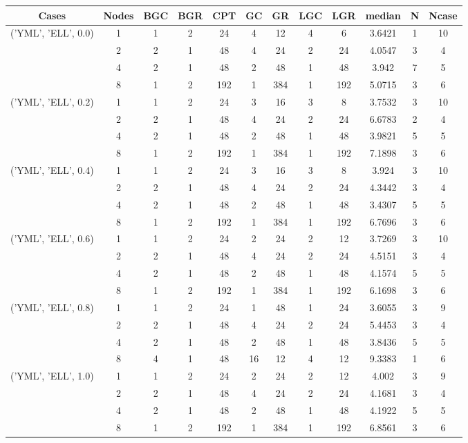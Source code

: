 \begin{tabular}{cccccccccccc}
\hline
Cases & Nodes& BGC& BGR& CPT& GC& GR& LGC& LGR& median & N & Ncase \\
\hline
\multirow{4}{*}{('YML', 'ELL', 0.0)}& 1& 1& 2& 24& 4& 12& 4& 6& 3.6421& 1& 10\\
& 2& 2& 1& 48& 4& 24& 2& 24& 4.0547& 3& 4\\
& 4& 2& 1& 48& 2& 48& 1& 48& 3.942& 7& 5\\
& 8& 1& 2& 192& 1& 384& 1& 192& 5.0715& 3& 6\\
\hline
\multirow{4}{*}{('YML', 'ELL', 0.2)}& 1& 1& 2& 24& 3& 16& 3& 8& 3.7532& 3& 10\\
& 2& 2& 1& 48& 4& 24& 2& 24& 6.6783& 2& 4\\
& 4& 2& 1& 48& 2& 48& 1& 48& 3.9821& 5& 5\\
& 8& 1& 2& 192& 1& 384& 1& 192& 7.1898& 3& 6\\
\hline
\multirow{4}{*}{('YML', 'ELL', 0.4)}& 1& 1& 2& 24& 3& 16& 3& 8& 3.924& 3& 10\\
& 2& 2& 1& 48& 4& 24& 2& 24& 4.3442& 3& 4\\
& 4& 2& 1& 48& 2& 48& 1& 48& 3.4307& 5& 5\\
& 8& 1& 2& 192& 1& 384& 1& 192& 6.7696& 3& 6\\
\hline
\multirow{4}{*}{('YML', 'ELL', 0.6)}& 1& 1& 2& 24& 2& 24& 2& 12& 3.7269& 3& 10\\
& 2& 2& 1& 48& 4& 24& 2& 24& 4.5151& 3& 4\\
& 4& 2& 1& 48& 2& 48& 1& 48& 4.1574& 5& 5\\
& 8& 1& 2& 192& 1& 384& 1& 192& 6.1698& 3& 6\\
\hline
\multirow{4}{*}{('YML', 'ELL', 0.8)}& 1& 1& 2& 24& 1& 48& 1& 24& 3.6055& 3& 9\\
& 2& 2& 1& 48& 4& 24& 2& 24& 5.4453& 3& 4\\
& 4& 2& 1& 48& 2& 48& 1& 48& 3.8436& 5& 5\\
& 8& 4& 1& 48& 16& 12& 4& 12& 9.3383& 1& 6\\
\hline
\multirow{4}{*}{('YML', 'ELL', 1.0)}& 1& 1& 2& 24& 2& 24& 2& 12& 4.002& 3& 9\\
& 2& 2& 1& 48& 4& 24& 2& 24& 4.1681& 3& 4\\
& 4& 2& 1& 48& 2& 48& 1& 48& 4.1922& 5& 5\\
& 8& 1& 2& 192& 1& 384& 1& 192& 6.8561& 3& 6\\
\hline
\end{tabular}
